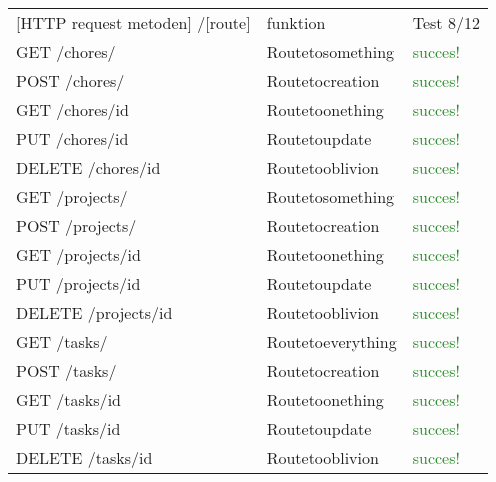 \documentclass{report}
\begin{document}
\begin{table}[H]
\centering
{}
\begin{tabularx}{\textwidth}{X X X}

[HTTP request metoden] /[route]
&
funktion
&
Test 8/12
\\

GET /chores/
&
Routetosomething
&
\textcolor{ForestGreen}{succes!}
\\

POST /chores/
&
Routetocreation
&
\textcolor{ForestGreen}{succes!}
\\

GET /chores/{id}
&
Routetoonething
&
\textcolor{ForestGreen}{succes!}
\\

PUT /chores/{id}
&
Routetoupdate
&
\textcolor{ForestGreen}{succes!}
\\

DELETE /chores/{id}
&
Routetooblivion
&
\textcolor{ForestGreen}{succes!}
\\



GET /projects/
&
Routetosomething
&
\textcolor{ForestGreen}{succes!}
\\

POST /projects/
&
Routetocreation
&
\textcolor{ForestGreen}{succes!}
\\

GET /projects/{id}
&
Routetoonething
&
\textcolor{ForestGreen}{succes!}
\\

PUT /projects/{id}
&
Routetoupdate
&
\textcolor{ForestGreen}{succes!}
\\

DELETE /projects/{id}
&
Routetooblivion
&
\textcolor{ForestGreen}{succes!}
\\

GET /tasks/
&
Routetoeverything
&
\textcolor{ForestGreen}{succes!}
\\

POST /tasks/
&
Routetocreation
&
\textcolor{ForestGreen}{succes!}
\\

GET /tasks/{id}
&
Routetoonething
&
\textcolor{ForestGreen}{succes!}
\\

PUT /tasks/{id}
&
Routetoupdate
&
\textcolor{ForestGreen}{succes!}
\\

DELETE /tasks/{id}
&
Routetooblivion
&
\textcolor{ForestGreen}{succes!}
\\

\hline
\end{tabularx}
\end{table}
\end{document}

